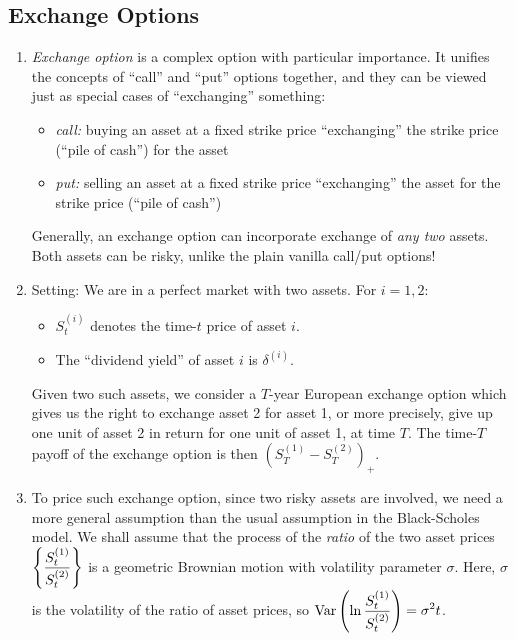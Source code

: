 \subsection{Exchange Options}
\label{subsect:exchange-opt}
\begin{enumerate}
\item \emph{Exchange option} is a complex option with particular importance. It
unifies the concepts of ``call'' and ``put'' options together, and they can be
viewed just as special cases of ``exchanging'' something:
\begin{itemize}
\item \emph{call:} buying an asset at a fixed strike price
 ``exchanging'' the strike price (``pile of cash'')
 for the asset
\item \emph{put:} selling an asset at a fixed strike price
 ``exchanging'' the asset for the strike price (``pile of
cash'') 
\end{itemize}
Generally, an exchange option can incorporate exchange of \emph{any two}
assets. Both assets can be risky, unlike the plain vanilla call/put options!

\item Setting: We are in a perfect market with two assets. For \(i=1,2\):
\begin{itemize}
\item \(S_t^{(i)}\) denotes the time-\(t\) price of asset \(i\).
\item The ``dividend yield'' of asset \(i\) is \(\delta^{(i)}\).
\end{itemize}
Given two such assets, we consider a \(T\)-year European exchange option which
gives us the right to exchange asset 2 for asset 1, or more precisely, give up
one unit of asset 2 in return for one unit of asset 1, at time \(T\). The
time-\(T\) payoff of the exchange option is then \((S_T^{(1)}-S_T^{(2)})_{+}\).

\item \label{it:ex-opt-assum} To price such exchange option, since two risky assets are involved, we
need a more general assumption than the usual assumption in the Black-Scholes
model. We shall assume that the process of the \emph{ratio} of the two asset
prices \(\displaystyle \qty{\frac{S_t^{(1)}}{S_t^{(2)}}}\) is a geometric
Brownian motion with volatility parameter \(\sigma\). Here, \(\sigma\) is the
volatility of the ratio of asset prices, so
\(\displaystyle \operatorname{Var}\qty(\ln\frac{S_t^{(1)}}{S_t^{(2)}})=\sigma^2 t\).


\end{enumerate}
